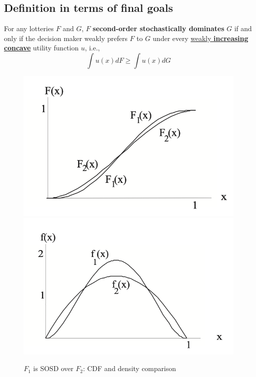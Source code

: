 \documentclass[11pt]{elegantbook}
\begin{document}
\subsection{Definition in terms of final goals}
\begin{definition}
    \normalfont
    For any lotteries $F$ and $G$, $F$ \textbf{second-order stochastically dominates} $G$ if and only if the decision maker weakly prefers $F$ to $G$ under every \underline{weakly \textbf{increasing concave}} utility function $u$, i.e.,
    $$\int u (x) dF \geq \int u(x) dG$$
\end{definition}
\begin{center}\begin{figure}[htbp]
    \centering
    \includegraphics[scale=0.25]{SOSD_1.png}
    \includegraphics[scale=0.25]{SOSD_2.png}
    \caption{$F_1$ is SOSD over $F_2$: CDF and density comparison}
    \label{}
\end{figure}\end{center}
\end{document}
